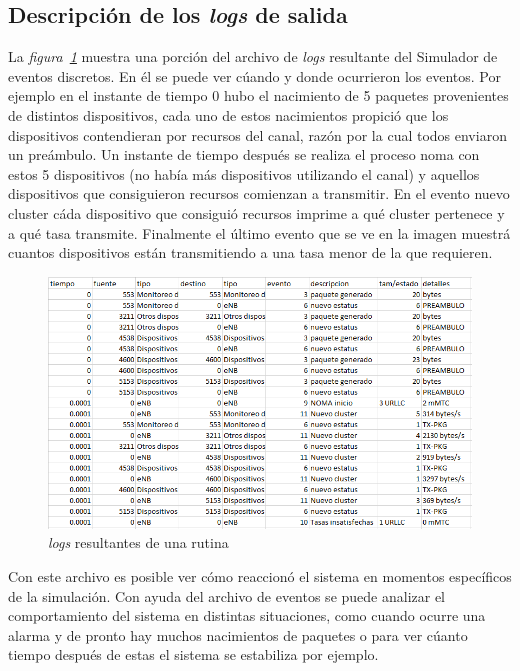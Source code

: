 \subsection{Descripción de los \textit{logs} de salida}

La \textit{figura~\ref{fig:logsdes}} muestra una porción del archivo de \textit{logs} resultante del Simulador de eventos discretos. En él se puede ver cúando y donde ocurrieron los eventos. Por ejemplo en el instante de tiempo 0 hubo el nacimiento de 5 paquetes provenientes de distintos dispositivos, cada uno de estos nacimientos propició que los dispositivos contendieran por recursos del canal, razón por la cual todos enviaron un preámbulo. Un instante de tiempo después se realiza el proceso noma con estos 5 dispositivos (no había más dispositivos utilizando el canal) y aquellos dispositivos que consiguieron recursos comienzan a transmitir. En el evento nuevo cluster cáda dispositivo que consiguió recursos imprime a qué cluster pertenece y a qué tasa transmite. Finalmente el último evento que se ve en la imagen muestrá cuantos dispositivos están transmitiendo a una tasa menor de la que requieren. \newline

\begin{figure}[th]
    \centering
    \includegraphics[scale=0.8]{Figures/logsdes.png}
    \decoRule
    \caption[\textit{logs} resultantes de una rutina]{\textit{logs} resultantes de una rutina}
    \label{fig:logsdes}
\end{figure}

Con este archivo es posible ver cómo reaccionó el sistema en momentos específicos de la simulación. Con ayuda del archivo de eventos se puede analizar el comportamiento del sistema en distintas situaciones, como cuando ocurre una alarma y de pronto hay muchos nacimientos de paquetes o para ver cúanto tiempo después de estas el sistema se estabiliza por ejemplo. \newline

